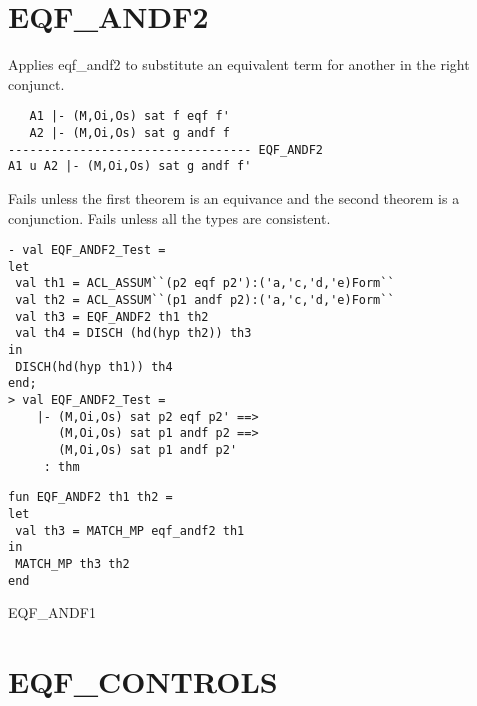 \ENDDOC

\section{EQF\_ANDF2}



\egroup

\SYNOPSIS 
Applies eqf_andf2 to substitute an equivalent term for
another in the right conjunct.

\DESCRIBE
\begin{verbatim}
   A1 |- (M,Oi,Os) sat f eqf f'
   A2 |- (M,Oi,Os) sat g andf f
---------------------------------- EQF_ANDF2
A1 u A2 |- (M,Oi,Os) sat g andf f'
\end{verbatim}
\FAILURE
Fails unless the first theorem is an equivance and the second theorem
is a conjunction.  Fails unless all the types are consistent.

\EXAMPLE
\begin{holboxed}
\begin{verbatim}
- val EQF_ANDF2_Test =
let
 val th1 = ACL_ASSUM``(p2 eqf p2'):('a,'c,'d,'e)Form``
 val th2 = ACL_ASSUM``(p1 andf p2):('a,'c,'d,'e)Form``
 val th3 = EQF_ANDF2 th1 th2
 val th4 = DISCH (hd(hyp th2)) th3
in
 DISCH(hd(hyp th1)) th4
end;
> val EQF_ANDF2_Test =
    |- (M,Oi,Os) sat p2 eqf p2' ==>
       (M,Oi,Os) sat p1 andf p2 ==>
       (M,Oi,Os) sat p1 andf p2'
     : thm
\end{verbatim}
\end{holboxed}

\IMPLEMENTATION
\begin{holboxed}
\begin{verbatim}
fun EQF_ANDF2 th1 th2 =
let
 val th3 = MATCH_MP eqf_andf2 th1
in
 MATCH_MP th3 th2
end
\end{verbatim}
\end{holboxed}
\SEEALSO
EQF\_ANDF1

\ENDDOC

\section{EQF\_CONTROLS}



\egroup

